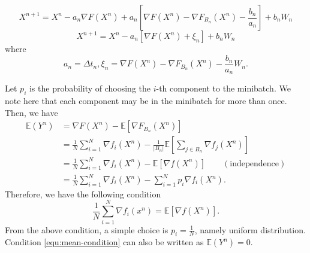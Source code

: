 \begin{equation} \label{equ:minibach-SA}
X^{n+1} = X^n - a_{n} \nabla F(X^n) + a_n
[\nabla F(X^n) - \nabla F_{B_n}(X^n)-\frac{b_n}{a_n}] + b_nW_n 
\end{equation}
\begin{equation} \label{equ:minibach-SA}
X^{n+1} = X^n - a_{n} [\nabla F(X^n) + \xi_n] + b_nW_n 
\end{equation}
where
$$
a_n=\Delta t_n, \xi_n=\nabla F(X^n) - \nabla F_{B_n}(X^n)-\frac{b_n}{a_n}W_n.
$$

Let $p_i$ is the probability of choosing the $i$-th component to
the minibatch. We note here that each component may be in the
minibatch for more than once. Then, we have 
$$ 
\begin{aligned}
\mathbb{E}(Y^n) &= \nabla F(X^n) - \mathbb{E} [\nabla F_{B_n}(X^n)] \\
&= \frac{1}{N} \sum_{i=1}^N \nabla f_i(X^n) - \frac{1}{|B_n|}
\mathbb{E}[\sum_{j\in B_n} \nabla f_j(X^n)] \\
&= \frac{1}{N} \sum_{i=1}^N \nabla f_i(X^n) - \mathbb{E}[\nabla
f(X^n)] \qquad (\text{independence}) \\
&= \frac{1}{N} \sum_{i=1}^N \nabla f_i(X^n) - \sum_{i=1}^N p_i \nabla
f_i(X^n).
\end{aligned}
$$ 
Therefore, we have the following condition
\begin{equation} \label{equ:mean-condition}
\frac{1}{N}\sum_{i=1}^N \nabla f_i(x^n) = \mathbb{E}[\nabla f(X^n)].
\end{equation}
From the above condition, a simple choice is $p_i = \frac{1}{N}$,
namely uniform distribution. Condition \eqref{equ:mean-condition}
can also be written as $\mathbb{E}(Y^n) = 0$.


